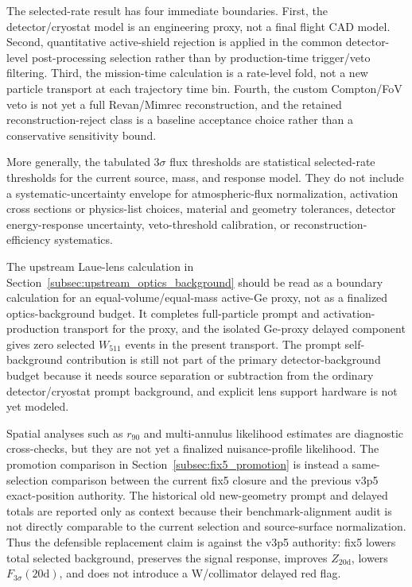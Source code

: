 \documentclass[preprint,12pt]{elsarticle}
\newcommand{\wii}{W_{511}}
\newcommand{\fthree}{F_{3\sigma}}
\begin{document}
The selected-rate result has four immediate boundaries. First, the detector/cryostat model is an engineering proxy, not a final flight CAD model. Second, quantitative active-shield rejection is applied in the common detector-level post-processing selection rather than by production-time trigger/veto filtering. Third, the mission-time calculation is a rate-level fold, not a new particle transport at each trajectory time bin. Fourth, the custom Compton/FoV veto is not yet a full Revan/Mimrec reconstruction, and the retained reconstruction-reject class is a baseline acceptance choice rather than a conservative sensitivity bound.

More generally, the tabulated $3\sigma$ flux thresholds are statistical selected-rate thresholds for the current source, mass, and response model. They do not include a systematic-uncertainty envelope for atmospheric-flux normalization, activation cross sections or physics-list choices, material and geometry tolerances, detector energy-response uncertainty, veto-threshold calibration, or reconstruction-efficiency systematics.

The upstream Laue-lens calculation in Section~\ref{subsec:upstream_optics_background} should be read as a boundary calculation for an equal-volume/equal-mass active-Ge proxy, not as a finalized optics-background budget. It completes full-particle prompt and activation-production transport for the proxy, and the isolated Ge-proxy delayed component gives zero selected $\wii$ events in the present transport. The prompt self-background contribution is still not part of the primary detector-background budget because it needs source separation or subtraction from the ordinary detector/cryostat prompt background, and explicit lens support hardware is not yet modeled.

Spatial analyses such as $r_{90}$ and multi-annulus likelihood estimates are diagnostic cross-checks, but they are not yet a finalized nuisance-profile likelihood. The promotion comparison in Section~\ref{subsec:fix5_promotion} is instead a same-selection comparison between the current fix5 closure and the previous v3p5 exact-position authority. The historical old new-geometry prompt and delayed totals are reported only as context because their benchmark-alignment audit is not directly comparable to the current selection and source-surface normalization. Thus the defensible replacement claim is against the v3p5 authority: fix5 lowers total selected background, preserves the signal response, improves $Z_{20\mathrm{d}}$, lowers $\fthree(20\mathrm{d})$, and does not introduce a W/collimator delayed red flag.
\end{document}
